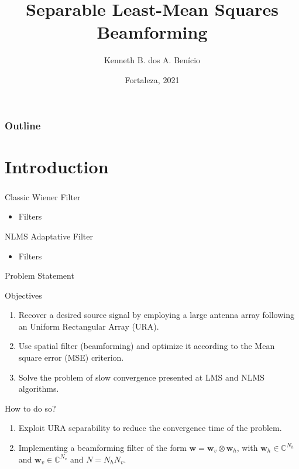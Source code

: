 \documentclass[10pt]{beamer}
\title[Short Title]{%
    Separable Least-Mean Squares Beamforming 
    \vspace{0.5cm}
}
\author{Kenneth B. dos A. Benício}
\institute{
        \textit{Department of Teleinformatics Engineering}\\
        \textit{Federal University of Ceará}
        \vspace{0.5cm}
}
\date[Fortaleza, 2021]{%
    Fortaleza, 2021
}
\begin{document}
{
    \maketitle
}


 \begin{frame}
 \frametitle{Outline}
 \tableofcontents
 \end{frame}


\section{Introduction}
\begin{frame}[allowframebreaks]
    \frametitle{\insertsection}
    \begin{block}{Classic Wiener Filter }
        \begin{itemize}
            \justifying
            \item Filters
        \end{itemize}
    \end{block}
    \begin{block}{NLMS Adaptative Filter}
        \begin{itemize}
            \justifying
            \item Filters
        \end{itemize}
    \end{block}
\end{frame}

\begin{frame}{Problem Statement}
    \begin{block}{Objectives}
        \begin{enumerate}
            \item Recover a desired source signal by employing a large antenna array following an Uniform Rectangular Array (URA).
            \item Use spatial filter (beamforming) and optimize it according to the Mean square error (MSE) criterion.
            \item Solve the problem of slow convergence presented at LMS and NLMS algorithms.
        \end{enumerate}
    \end{block}
    \begin{block}{How to do so?}
        \begin{enumerate}
            \item Exploit URA separability to reduce the convergence time of the problem.
            \item Implementing a beamforming filter of the form $\mathbf{w} = \mathbf{w}_{v} \otimes \mathbf{w}_{h}$, with $\mathbf{w}_{h} \in \mathbb{C}^{N_{h}}$ and $\mathbf{w}_{v} \in \mathbb{C}^{N_{v}}$ and $N = N_{h} N_{v}$.
        \end{enumerate}
    \end{block}    
\end{frame}
\end{document}
